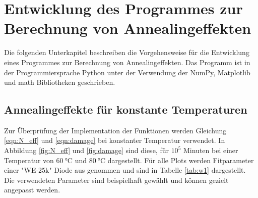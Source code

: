 \chapter{Entwicklung des Programmes zur Berechnung von Annealingeffekten}\label{make}
Die folgenden Unterkapitel beschreiben die Vorgehensweise für die Entwicklung  eines Programmes zur
Berechnung von Annealingeffekten. Das Programm ist in der Programmiersprache Python unter
der Verwendung der NumPy, Matplotlib und math Bibliotheken geschrieben.
\section{Annealingeffekte für konstante Temperaturen}
Zur Überprüfung der Implementation der Funktionen werden
Gleichung \ref{eqn:N_eff} und \ref{eqn:damage}  bei konstanter Temperatur verwendet. In
Abbildung \ref{fig:N_eff} und \ref{fig:damage} sind diese, für $10^5$ Minuten bei einer Temperatur
von $\SI{60}{\celsius}$ und $\SI{80}{\celsius}$  dargestellt.
Für alle Plots werden Fitparameter
einer "WE-25k" Diode aus \cite{moll} genommen und sind in Tabelle \ref{tab:w1} dargestellt. Die verwendeten
Parameter sind beispielhaft gewählt und können gezielt angepasst werden.


